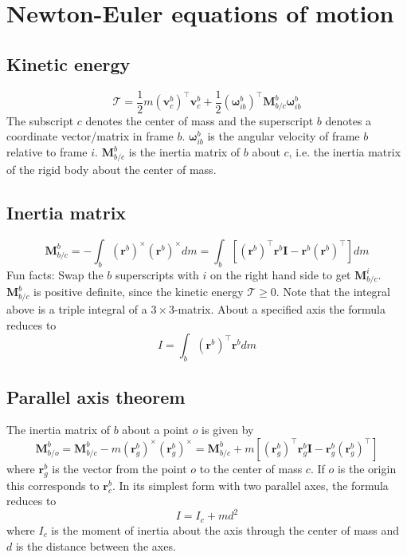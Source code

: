 \section{Newton-Euler equations of motion}
\subsection{Kinetic energy}
\begin{equation}
    \mathcal{T} = \frac{1}{2} m (\mathbf{v}_c^b)^\top \mathbf{v}_c^b +  \frac{1}{2} (\boldsymbol{\omega}_{ib}^b)^\top \mathbf{M}_{b/c}^b \boldsymbol{\omega}_{ib}^b
\end{equation}
The subscript $c$ denotes the center of mass and the superscript $b$ denotes a coordinate vector/matrix in frame $b$. $\boldsymbol{\omega}_{ib}^b$ is the angular velocity of frame $b$ relative to frame $i$. $\mathbf{M}_{b/c}^b$ is the inertia matrix of $b$ about $c$, i.e. the inertia matrix of the rigid body about the center of mass.

\subsection{Inertia matrix}
\begin{equation}
    \mathbf{M}_{b/c}^b = -\int_b (\mathbf{r}^b)^\times (\mathbf{r}^b)^\times dm = \int_b \left[ (\mathbf{r}^b)^\top \mathbf{r}^b \mathbf{I} - \mathbf{r}^b (\mathbf{r}^b)^\top \right] dm
\end{equation}
Fun facts: Swap the $b$ superscripts with $i$ on the right hand side to get $\mathbf{M}_{b/c}^i$. $\mathbf{M}_{b/c}^b$ is positive definite, since the kinetic energy $\mathcal{T} \geq 0$. Note that the integral above is a triple integral of a $3 \times 3$-matrix. About a specified axis the formula reduces to
\begin{equation}
    I = \int_{b} (\mathbf{r}^b)^\top \mathbf{r}^b dm
\end{equation}

\subsection{Parallel axis theorem}
The inertia matrix of $b$ about a point $o$ is given by
\begin{equation}
    \mathbf{M}_{b/o}^b = \mathbf{M}_{b/c}^b - m (\mathbf{r}_g^b)^\times (\mathbf{r}_g^b)^\times =
    \mathbf{M}_{b/c}^b + m\left[ (\mathbf{r}_g^b)^\top \mathbf{r}_g^b \mathbf{I} - \mathbf{r}_g^b (\mathbf{r}_g^b)^\top \right]
\end{equation}
where $\mathbf{r}_g^b$ is the vector from the point $o$ to the center of mass $c$. If $o$ is the origin this corresponds to $\mathbf{r}_c^b$. In its simplest form with two parallel axes, the formula reduces to
\begin{equation}
    I = I_c + md^2
\end{equation}
where $I_c$ is the moment of inertia about the axis through the center of mass and $d$ is the distance between the axes.

